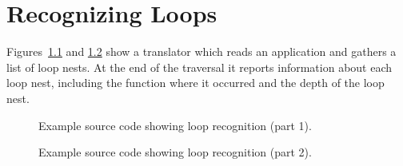 \chapter{Recognizing Loops}

   Figures~\ref{Tutorial:exampleLoopRecognition-part1} and
\ref{Tutorial:exampleLoopRecognition-part2} show a translator which
reads an application and gathers a list of loop nests.  At the end of the traversal it
reports information about each loop nest, including the function where it occurred
and the depth of the loop nest.


\begin{figure}[!h]
{\indent
{\mySmallestFontSize


\begin{latexonly}
   
\end{latexonly}

\begin{htmlonly}
   
\end{htmlonly}

}
}
\caption{Example source code showing loop recognition (part 1).}
\label{Tutorial:exampleLoopRecognition-part1}
\end{figure}

\begin{figure}[!h]
{\indent
{\mySmallestFontSize


\begin{latexonly}
   
\end{latexonly}

\begin{htmlonly}
   
\end{htmlonly}

}
}
\caption{Example source code showing loop recognition (part 2).}
\label{Tutorial:exampleLoopRecognition-part2}
\end{figure}


